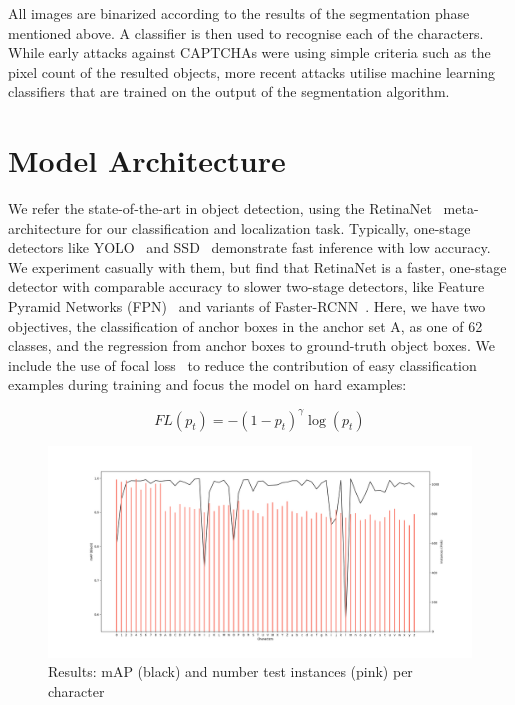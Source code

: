 \documentclass[twocolumn,10pt]{article}
\begin{document}
All images are binarized according to the results of the segmentation phase mentioned above. A classifier is then used to recognise each of the characters. While early attacks against CAPTCHAs were using simple criteria such as the pixel count of the resulted objects, more recent attacks utilise machine learning classifiers that are trained on the output of the segmentation algorithm.

\section{Model Architecture}

We refer the state-of-the-art in object detection, using the RetinaNet~\cite{fl} meta-architecture for our classification and localization task. Typically, one-stage detectors like YOLO~\cite{yolov3} and SSD~\cite{ssd} demonstrate fast inference with low accuracy. We experiment casually with them, but find that RetinaNet is a faster, one-stage detector with comparable accuracy to slower two-stage detectors, like Feature Pyramid Networks (FPN)~\cite{fpn} and variants of Faster-RCNN~\cite{faster}. Here, we have two objectives, the classification of anchor boxes in the anchor set A, as one of 62 classes, and the regression from anchor boxes to ground-truth object boxes. We include the use of focal loss~\cite{fl} to reduce the contribution of easy classification examples during training and focus the model on hard examples:

\begin{equation}
  FL(p_t) = -(1-p_t)^\gamma \log (p_t)
\end{equation}

\begin{figure}
  \centering
  \includegraphics[width=\textwidth]{results.PNG}
  \caption{Results: mAP (black) and number test instances (pink) per character}
\label{fig:results}
\end{figure}
\end{document}
